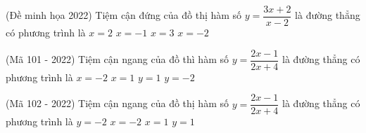 \begin{ex}%
	(Đề minh họa 2022) Tiệm cận đứng của đồ thị hàm số $y=\dfrac{3 x+2}{x-2}$ là đường thẳng có phương trình là
	\choice
	{\True $x=2$}
	{$x=-1$}
	{$x=3$}
	{$x=-2$}
\end{ex}

\begin{ex}%
	(Mã 101 - 2022) Tiệm cận ngang của đồ thì hàm số $y=\dfrac{2 x-1}{2 x+4}$ là đường thẳng có phương trình là
	\choice
	{$x=-2$}
	{$x=1$}
	{\True $y=1$}
	{$y=-2$}
\end{ex}

\begin{ex}%
	(Mã 102 - 2022) Tiệm cận ngang của đồ thị hàm số $y=\dfrac{2 x-1}{2 x+4}$ là đường thẳng có phương trình là
	\choice
	{$y=-2$}
	{$x=-2$}
	{$x=1$}
	{\True $y=1$}
\end{ex}

